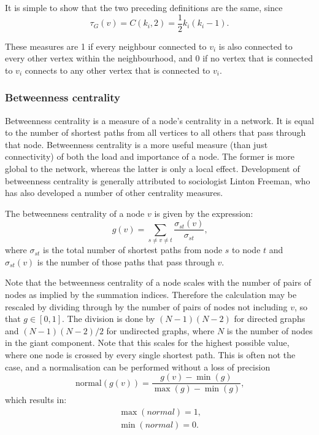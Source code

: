         It is simple to show that the two preceding definitions are the same, since
        \begin{equation}
          \tau_G(v) = C({k_i},2) = \frac{1}{2}k_i(k_i-1) \mbox{.}
        \end{equation}

        These measures are 1 if every neighbour connected to $v_i$ is also connected to every other vertex within the neighbourhood, and 0 if no vertex that is connected to $v_i$ connects to any other vertex that is connected to $v_i$.

    \subsubsection{Betweenness centrality}
        
      Betweenness centrality is a measure of a node's centrality in a network. It is equal to the number of shortest paths from all vertices to all others that pass through that node. Betweenness centrality is a more useful measure (than just connectivity) of both the load and importance of a node. The former is more global to the network, whereas the latter is only a local effect. Development of betweenness centrality is generally attributed to sociologist Linton Freeman, who has also developed a number of other centrality measures\cite{Freeman1977}.
          
      The betweenness centrality of a node $v$ is given by the expression:
      \begin{equation}
        g(v) = \sum_{s \neq v \neq t} \frac{\sigma_{st}(v)}{\sigma_{st}} \mbox{,}
      \end{equation}
      where $\sigma_{st}$ is the total number of shortest paths from node $s$ to node $t$ and $\sigma_{st}(v)$ is the number of those paths that pass through $v$.
          
      Note that the betweenness centrality of a node scales with the number of pairs of nodes as implied by the summation indices. Therefore the calculation may be rescaled by dividing through by the number of pairs of nodes not including $v$, so that $g \in [0,1]$. The division is done by $(N-1)(N-2)$ for directed graphs and $(N-1)(N-2)/2$ for undirected graphs, where $N$ is the number of nodes in the giant component. Note that this scales for the highest possible value, where one node is crossed by every single shortest path. This is often not the case, and a normalisation can be performed without a loss of precision
      \begin{equation}
        \mbox{normal}(g(v)) = \frac{g(v) - \min(g)}{\max(g) - \min(g)}\mbox{,}
      \end{equation}
      which results in:
      \begin{equation}
        \begin{split}
          \max(normal) = 1 \mbox{,}\\
          \min(normal) = 0 \mbox{.}
        \end{split}
      \end{equation}
      
